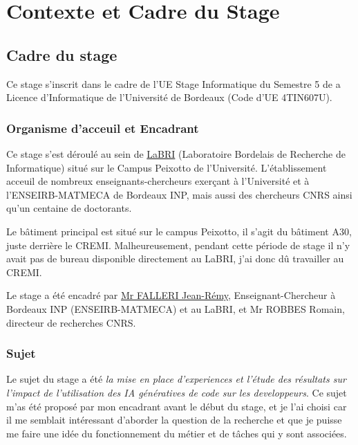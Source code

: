 \chapter{Contexte et Cadre du Stage}
\label{context}

\section{Cadre du stage}

Ce stage s'inscrit dans le cadre de l'UE Stage Informatique du Semestre 5 de a Licence d'Informatique de l'Université de Bordeaux (Code d'UE 4TIN607U).

\subsection{Organisme d'acceuil et Encadrant}

Ce stage s'est déroulé au sein de \href{https://www.labri.fr/}{LaBRI} (Laboratoire Bordelais de Recherche de Informatique) situé sur le Campus Peixotto de l'Université.
L'établissement acceuil de nombreux enseignants-chercheurs exerçant à l'Université et à l'ENSEIRB-MATMECA de Bordeaux INP,
mais aussi des chercheurs CNRS ainsi qu'un centaine de doctorants.

Le bâtiment principal est situé sur le campus Peixotto, il s'agit du bâtiment A30, juste derrière le CREMI.
Malheureusement, pendant cette période de stage il n'y avait pas de bureau disponible directement au LaBRI,
j'ai donc dû travailler au CREMI.

Le stage a été encadré par \href{https://www.labri.fr/perso/falleri/}{Mr FALLERI Jean-Rémy}, Enseignant-Chercheur à Bordeaux INP (ENSEIRB-MATMECA) et au LaBRI, et Mr ROBBES Romain, directeur de recherches CNRS.

\subsection{Sujet}

Le sujet du stage a été \emph{la mise en place d'experiences et l'étude des résultats sur l’impact de l’utilisation des IA génératives de code sur les developpeurs}.
Ce sujet m'as été proposé par mon encadrant avant le début du stage, et je l'ai choisi car il me semblait intéressant d'aborder la question de la recherche et que je puisse me faire une idée du fonctionnement du métier et de tâches qui y sont associées.
